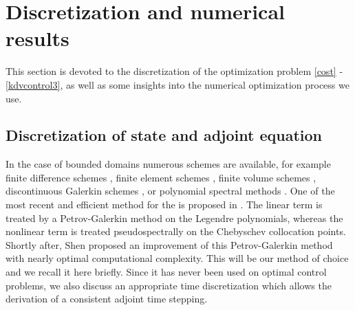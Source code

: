 \section{Discretization and numerical results}
\label{secnum}
This section is devoted to the discretization of the optimization problem \eqref{cost} - \eqref{kdvcontrol3}, as well as some insights into the numerical optimization process we use.
\subsection{Discretization of state and adjoint equation}
In the case of bounded domains numerous schemes are available, for example finite difference schemes \cite{djidjeli1995numerical,zabusky1965interaction}, finite element schemes \cite{winther1980conservative,arnold1982superconvergent}, finite volume schemes \cite{dutykh2013finite}, discontinuous Galerkin schemes \cite{Bona1986859,yan2002local}, or polynomial spectral methods \cite{ma2000legendre,ma2001optimal,shen2003new}. One of the most recent and efficient method for the \KdV is proposed in \cite{ma2000legendre}. The linear term is treated by a Petrov-Galerkin method on the Legendre polynomials, whereas the nonlinear term is treated pseudospectrally on the Chebyschev collocation points. Shortly after, Shen \cite{shen2003new} proposed an improvement of this Petrov-Galerkin method with nearly optimal computational complexity. This will be our method of choice and we recall it here briefly. Since it has never been used on optimal control problems, we also discuss an appropriate time discretization which allows the derivation of a consistent adjoint time stepping.

